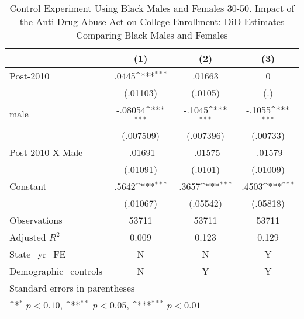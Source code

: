 \begin{table}[htbp]\centering
\def\sym#1{\ifmmode^{#1}\else\(^{#1}\)\fi}
\caption{Control Experiment Using Black Males and Females 30-50. Impact of the Anti-Drug Abuse Act on College Enrollment: DiD Estimates Comparing Black Males and Females}
\begin{tabular}{l*{3}{c}}
\hline\hline
                    &\multicolumn{1}{c}{(1)}         &\multicolumn{1}{c}{(2)}         &\multicolumn{1}{c}{(3)}         \\
\hline
Post-2010           &       .0445\sym{***}&      .01663         &           0         \\
                    &    (.01103)         &     (.0105)         &         (.)         \\
[1em]
male                &     -.08054\sym{***}&      -.1045\sym{***}&      -.1055\sym{***}\\
                    &   (.007509)         &   (.007396)         &    (.00733)         \\
[1em]
Post-2010 X Male    &     -.01691         &     -.01575         &     -.01579         \\
                    &    (.01091)         &     (.0101)         &    (.01009)         \\
[1em]
Constant            &       .5642\sym{***}&       .3657\sym{***}&       .4503\sym{***}\\
                    &    (.01067)         &    (.05542)         &    (.05818)         \\
\hline
Observations        &       53711         &       53711         &       53711         \\
Adjusted \(R^{2}\)  &       0.009         &       0.123         &       0.129         \\
State\_yr\_FE         &           N         &           N         &           Y         \\
Demographic\_controls&           N         &           Y         &           Y         \\
\hline\hline
\multicolumn{4}{l}{\footnotesize Standard errors in parentheses}\\
\multicolumn{4}{l}{\footnotesize \sym{*} \(p<0.10\), \sym{**} \(p<0.05\), \sym{***} \(p<0.01\)}\\
\end{tabular}
\end{table}
